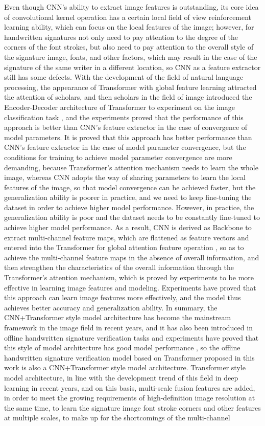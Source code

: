 Even though CNN's ability to extract image features is outstanding, its core idea of convolutional kernel operation has a certain local field of view reinforcement learning ability, which can focus on the local features of the image; however, for handwritten signatures not only need to pay attention to the degree of the corners of the font strokes, but also need to pay attention to the overall style of the signature image, fonts, and other factors, which may result in the case of the signature of the same writer in a different location, so CNN as a feature extractor still has some defects. With the development of the field of natural language processing, the appearance of Transformer \cite{36} with global feature learning attracted the attention of scholars, and then scholars in the field of image introduced the Encoder-Decoder architecture of Transformer to experiment on the image classification task \cite{4}, and the experiments proved that the performance of this approach is better than CNN's feature extractor in the case of convergence of model parameters. It is proved that this approach has better performance than CNN's feature extractor in the case of model parameter convergence, but the conditions for training to achieve model parameter convergence are more demanding, because Transformer's attention mechanism needs to learn the whole image, whereas CNN adopts the way of sharing parameters to learn the local features of the image, so that model convergence can be achieved faster, but the generalization ability is poorer in practice, and we need to keep fine-tuning the dataset in order to achieve higher model performance. However, in practice, the generalization ability is poor and the dataset needs to be constantly fine-tuned to achieve higher model performance. As a result, CNN is derived as Backbone to extract multi-channel feature maps, which are flattened as feature vectors and entered into the Transformer for global attention feature operation \cite{9}, so as to achieve the multi-channel feature maps in the absence of overall information, and then strengthen the characteristics of the overall information through the Transformer's attention mechanism, which is proved by experiments to be more effective in learning image features and modeling. Experiments have proved that this approach can learn image features more effectively, and the model thus achieves better accuracy and generalization ability. In summary, the CNN+Transformer style model architecture has become the mainstream framework in the image field in recent years, and it has also been introduced in offline handwritten signature verification tasks and experiments have proved that this style of model architecture has good model performance \cite{9}, so the offline handwritten signature verification model based on Transformer proposed in this work is also a CNN+Transformer style model architecture. Transformer style model architecture, in line with the development trend of this field in deep learning in recent years, and on this basis, multi-scale fusion features are added, in order to meet the growing requirements of high-definition image resolution at the same time, to learn the signature image font stroke corners and other features at multiple scales, to make up for the shortcomings of the multi-channel 